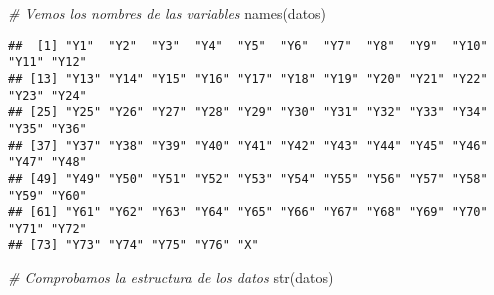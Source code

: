 \documentclass[
]{article}
\newenvironment{Shaded}{\begin{snugshade}}{\end{snugshade}}
\newcommand{\CommentTok}[1]{\textcolor[rgb]{0.56,0.35,0.01}{\textit{#1}}}
\newcommand{\FunctionTok}[1]{\textcolor[rgb]{0.00,0.00,0.00}{#1}}
\newcommand{\NormalTok}[1]{#1}
\begin{document}
\begin{Shaded}
\begin{Highlighting}[]
\CommentTok{\# Vemos los nombres de las variables}
\FunctionTok{names}\NormalTok{(datos)}
\end{Highlighting}
\end{Shaded}

\begin{verbatim}
##  [1] "Y1"  "Y2"  "Y3"  "Y4"  "Y5"  "Y6"  "Y7"  "Y8"  "Y9"  "Y10" "Y11" "Y12"
## [13] "Y13" "Y14" "Y15" "Y16" "Y17" "Y18" "Y19" "Y20" "Y21" "Y22" "Y23" "Y24"
## [25] "Y25" "Y26" "Y27" "Y28" "Y29" "Y30" "Y31" "Y32" "Y33" "Y34" "Y35" "Y36"
## [37] "Y37" "Y38" "Y39" "Y40" "Y41" "Y42" "Y43" "Y44" "Y45" "Y46" "Y47" "Y48"
## [49] "Y49" "Y50" "Y51" "Y52" "Y53" "Y54" "Y55" "Y56" "Y57" "Y58" "Y59" "Y60"
## [61] "Y61" "Y62" "Y63" "Y64" "Y65" "Y66" "Y67" "Y68" "Y69" "Y70" "Y71" "Y72"
## [73] "Y73" "Y74" "Y75" "Y76" "X"
\end{verbatim}

\begin{Shaded}
\begin{Highlighting}[]
\CommentTok{\# Comprobamos la estructura de los datos}
\FunctionTok{str}\NormalTok{(datos)}
\end{Highlighting}
\end{Shaded}
\end{document}

